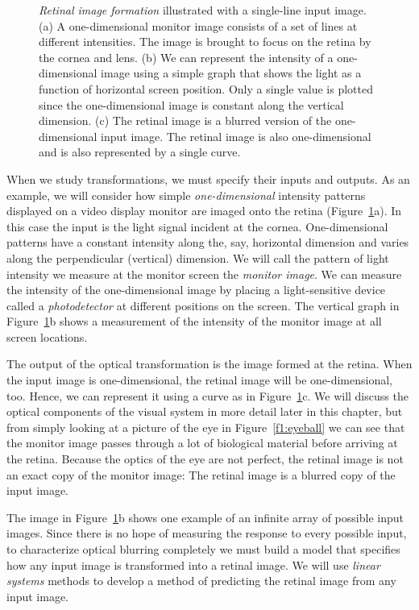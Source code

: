 \begin{figure}
\centerline {
}
\caption[Monitor to Retina]{
{\em Retinal image formation} illustrated with a single-line
input image.
(a) A one-dimensional monitor image consists of a set of 
lines at different intensities.
The image is brought to focus on the retina
by the cornea and lens.
(b) We can represent the intensity of a
one-dimensional image using a simple graph 
that shows the light as a function of horizontal screen position.
Only a single value is plotted since the one-dimensional
image is constant along the vertical dimension.
(c) The retinal image is a blurred version of the one-dimensional
input image.
The retinal image is also one-dimensional and
is also represented by a single curve.
}
\label{f1:monitor.to.retina}
\end{figure}
When we study transformations, we must specify
their inputs and outputs.
As an example, we will consider how simple
{\em one-dimensional} intensity
patterns displayed on a video display monitor
are imaged onto the retina (Figure~\ref{f1:monitor.to.retina}a).
In this case the input is
the light signal incident at the cornea.
One-dimensional patterns have a constant intensity along
the, say, horizontal dimension and varies along the 
perpendicular (vertical) dimension.
We will call the pattern of light intensity
we measure at the monitor screen the {\em monitor image}.
We can measure the intensity of the one-dimensional
image by placing a light-sensitive device called a {\em photodetector}
at different positions on the screen.
The vertical graph in Figure~\ref{f1:monitor.to.retina}b shows
a measurement of the intensity of the monitor image at all screen locations.

The output of the optical transformation is the image formed
at the retina.
When the input image is one-dimensional, the retinal image
will be one-dimensional, too.
Hence, we can represent it using a curve as in
Figure~\ref{f1:monitor.to.retina}c.
We will discuss the optical components of the visual
system in more detail later in this chapter,
but from simply looking at a picture of the
eye in Figure~\ref{f1:eyeball} we can see that
the monitor image passes through a lot of biological material
before arriving at the retina.
Because the optics of the eye are not perfect, the retinal
image is not an exact copy of the monitor image:
The retinal image is a blurred copy of the input image.

The image in Figure~\ref{f1:monitor.to.retina}b shows one example
of an infinite array of possible input images.
Since there is no hope of measuring the response to
every possible input,
to characterize optical blurring completely
we must build a model
that specifies how any input image
is transformed into a retinal image.
We will use {\em linear systems} methods
to develop a method of predicting
the retinal image from any input image.

